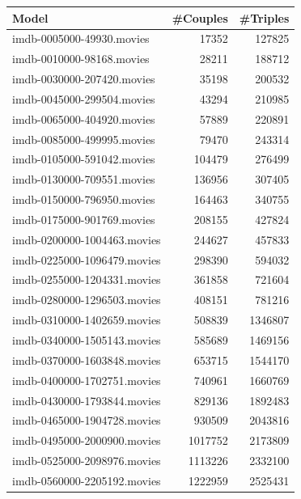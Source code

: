 \documentclass[a4paper,11pt]{article}
\begin{document}
\begin{table}[h!]
  \centering
  \begin{tabular}{| l | r | r |}
    \hline
    \textbf{Model}              & \textbf{\#Couples} & \textbf{\#Triples}\\
    \hline
    imdb-0005000-49930.movies   & 17352              & 127825\\
    imdb-0010000-98168.movies   & 28211              & 188712\\
    imdb-0030000-207420.movies  & 35198              & 200532\\
    imdb-0045000-299504.movies  & 43294              & 210985\\
    imdb-0065000-404920.movies  & 57889              & 220891\\
    imdb-0085000-499995.movies  & 79470              & 243314\\
    imdb-0105000-591042.movies  & 104479             & 276499\\
    imdb-0130000-709551.movies  & 136956             & 307405\\
    imdb-0150000-796950.movies  & 164463             & 340755\\
    imdb-0175000-901769.movies  & 208155             & 427824\\
    imdb-0200000-1004463.movies & 244627             & 457833\\
    imdb-0225000-1096479.movies & 298390             & 594032\\
    imdb-0255000-1204331.movies & 361858             & 721604\\
    imdb-0280000-1296503.movies & 408151             & 781216\\
    imdb-0310000-1402659.movies & 508839             & 1346807\\
    imdb-0340000-1505143.movies & 585689             & 1469156\\
    imdb-0370000-1603848.movies & 653715             & 1544170\\
    imdb-0400000-1702751.movies & 740961             & 1660769\\
    imdb-0430000-1793844.movies & 829136             & 1892483\\
    imdb-0465000-1904728.movies & 930509             & 2043816\\
    imdb-0495000-2000900.movies & 1017752            & 2173809\\
    imdb-0525000-2098976.movies & 1113226            & 2332100\\
    imdb-0560000-2205192.movies & 1222959            & 2525431\\

\end{tabular}
\end{table}
\end{document}

